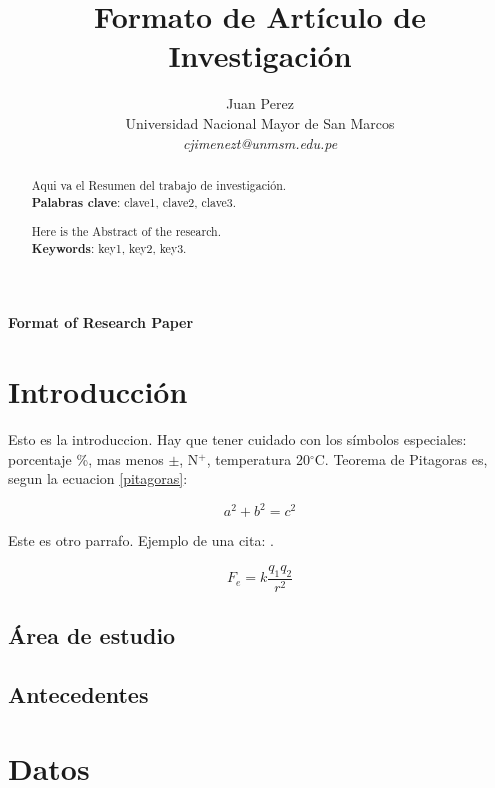 \documentclass[a4paper,11pt]{article}
\title{Formato de Artículo de Investigación}
\author{Juan Perez\\
 Universidad Nacional Mayor de San Marcos \\
\emph{cjimenezt@unmsm.edu.pe}\\}
\begin{document}
\maketitle

\begin{abstract} \noindent 
Aqui va el Resumen del trabajo de investigación. \\
\textbf{Palabras clave}: clave1, clave2, clave3.
\end{abstract}

\centerline{\textbf{Format of Research Paper}} 
\renewcommand{\abstractname}{Abstract}

\begin{abstract} \noindent		
Here is the Abstract of the research. \\
\textbf{Keywords}: key1, key2, key3.
\end{abstract}


\section{Introducción}
Esto es la introduccion. Hay que tener cuidado con los símbolos especiales: porcentaje \%, mas menos $\pm$, N$^+$, temperatura 20$^\circ$C. Teorema de Pitagoras es, segun la ecuacion \ref{pitagoras}:

\begin{equation}
a^2 + b^2 = c^2
\label{pitagoras}
\end{equation}

Este es otro parrafo. Ejemplo de una cita: \cite{Ben2018}.

\begin{equation}
F_e = k \frac{q_1 q_{2}}{r^2} 
\end{equation}

\subsection*{Área de estudio}

\subsection*{Antecedentes}

\section{Datos}
\end{document}
